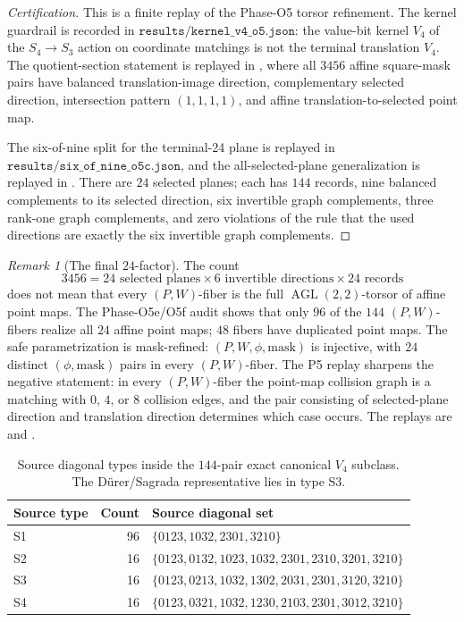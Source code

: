 \documentclass[11pt,a4paper]{article}
\theoremstyle{definition}
\theoremstyle{remark}
\newtheorem{remark}[theorem]{Remark}
\newcommand{\AGL}{\operatorname{AGL}}
\newcommand{\Durer}{D\"urer\xspace}
\begin{document}
\begin{proof}[Certification]
This is a finite replay of the Phase-O5 torsor refinement.  The kernel
guardrail is recorded in
\(\texttt{results/kernel\_v4\_o5.json}\): the value-bit kernel \(V_4\) of
the \(S_4\to S_3\) action on coordinate matchings is not the terminal
translation \(V_4\).  The quotient-section statement is replayed in
, where all \(3456\)
affine square-mask pairs have balanced translation-image
direction, complementary selected direction, intersection pattern
\((1,1,1,1)\), and affine translation-to-selected point map.

The six-of-nine split for the terminal-24 plane is replayed in
\(\texttt{results/six\_of\_nine\_o5c.json}\), and the all-selected-plane
generalization is replayed in
.  There are \(24\)
selected planes; each has \(144\) records, nine balanced
complements to its selected direction, six invertible graph complements,
three rank-one graph complements, and zero violations of the rule that the
used directions are exactly the six invertible graph complements.
\end{proof}

\begin{remark}[The final \(24\)-factor]
The count
\[
3456=24\text{ selected planes}\times6\text{ invertible directions}
\times24\text{ records}
\]
does not mean that every \((P,W)\)-fiber is the full
\(\AGL(2,2)\)-torsor of affine point maps.  The Phase-O5e/O5f audit shows
that only \(96\) of the \(144\) \((P,W)\)-fibers realize all \(24\) affine
point maps; \(48\) fibers have duplicated point maps.  The safe
parametrization is mask-refined: \((P,W,\phi,\mathrm{mask})\) is injective,
with \(24\) distinct \((\phi,\mathrm{mask})\) pairs in every \((P,W)\)-fiber.
The P5 replay sharpens the negative statement: in every \((P,W)\)-fiber the
point-map collision graph is a matching with \(0\), \(4\), or \(8\) collision
edges, and the pair consisting of selected-plane direction and translation
direction determines which case occurs.  The replays are
 and
.
\end{remark}

\begin{table}[htbp]
\centering
\begin{tabular}{lrl}
\toprule
Source type & Count & Source diagonal set\\
\midrule
S1 & 96 & \(\{0123,1032,2301,3210\}\)\\
S2 & 16 & \(\{0123,0132,1023,1032,2301,2310,3201,3210\}\)\\
S3 & 16 & \(\{0123,0213,1032,1302,2031,2301,3120,3210\}\)\\
S4 & 16 & \(\{0123,0321,1032,1230,2103,2301,3012,3210\}\)\\
\bottomrule
\end{tabular}
\caption{Source diagonal types inside the \(144\)-pair exact canonical
\(V_4\) subclass.  The \Durer/Sagrada representative lies in type S3.}
\label{tab:v4-source-types}
\end{table}
\end{document}
